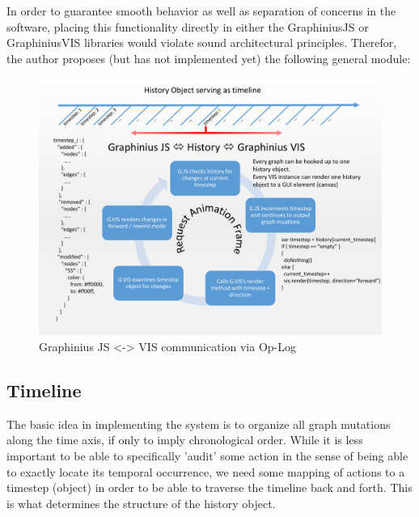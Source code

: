 	In order to guarantee smooth behavior as well as separation of concerns in the software, placing this functionality directly in either the GraphiniusJS or GraphiniusVIS libraries would violate sound architectural principles. Therefor, the author proposes (but has not implemented yet) the following general module:
	
	\begin{landscape}
		\begin{figure}[ht]
			\label{fig_history_workflow}
			\centering
			\vspace{-2.0cm}
			\includegraphics[width=1.6\textwidth]{figures/History_Workflow_pdf}
			\caption{Graphinius JS <-> VIS communication via Op-Log}
		\end{figure}
	\end{landscape}

	\subsection{Timeline}
	\label{ssect:timeline}
	
	The basic idea in implementing the system is to organize all graph mutations along the time axis, if only to imply chronological order. While it is less important to be able to specifically 'audit' some action in the sense of being able to exactly locate its temporal occurrence, we need some mapping of actions to a timestep (object) in order to be able to traverse the timeline back and forth. This is what determines the structure of the history object.
	

